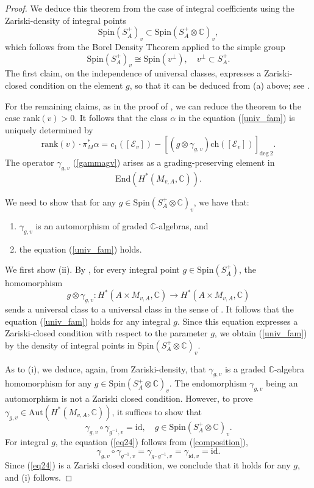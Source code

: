 \documentclass[11pt]{amsart}
\theoremstyle{plain}
\theoremstyle{definition}
\theoremstyle{remark}
\newcommand{\BC}{{\mathbb{C}}}
\newcommand{\CE}{{\mathcal E}}
\begin{document}
\begin{proof}
We deduce this theorem  from the case of integral coefficients using the Zariski-density of integral points
\[
\mathrm{Spin}(S_A^+)_v \subset \mathrm{Spin}(S_A^+ \otimes \BC)_v,
\]
which follows from the Borel Density Theorem \cite{Borel} applied to the simple group
\[
\mathrm{Spin}(S_A^+)_v \cong \mathrm{Spin}(v^\perp), \quad v^\perp \subset S_A^+.
\]
The first claim, on the independence of universal classes, expresses a Zariski-closed condition on the element $g$, so that  it can be deduced from (a) above; see \cite[Lemma 3.11]{Markman2}.

For the remaining claims, as in the proof of \cite[Corollary 8.4]{Markman3}, we can reduce the theorem to the case $\mathrm{rank}(v) >0$. It follows that  the class $\alpha$ in the equation (\ref{univ_fam}) is uniquely determined  by
\[
\mathrm{rank}(v) \cdot \pi_M^\ast \alpha = c_1([\CE_v])- \left[(g\otimes \gamma_{g,v}) \mathrm{ch}([\CE_v])\right]_{\mathrm{deg}~2}.
\]
The operator $\gamma_{g,v}$  (\ref{gammagv})  arises as a grading-preserving element in
 \[
\mathrm{End}(H^*(M_{v,A}, \BC)).
\]

We need to show that for any $g\in \mathrm{Spin}(S_A^+ \otimes \BC)_v$, we have that:
\begin{enumerate}
    \item[(i)] $\gamma_{g,v}$ is an automorphism of graded $\BC$-algebras, and
    \item[(ii)] the equation (\ref{univ_fam}) holds.
\end{enumerate}

We first show (ii). By \cite[Corollary 8.4]{Markman3},  for every integral point $g \in \mathrm{Spin}(S_A^+)$, the homomorphism 
\[
g\otimes \gamma_{g,v}: H^*(A \times M_{v,A}, \BC) \to H^*(A \times M_{v,A}, \BC)
\]
sends  a universal class to a universal class in the sense of \cite[Definition 3.4]{Markman3}.  It follows that the equation (\ref{univ_fam}) holds for any integral $g$. Since this equation expresses  a Zariski-closed condition with respect to the parameter $g$, we obtain (\ref{univ_fam}) by the density of integral points in $\mathrm{Spin}(S_A^+ \otimes \BC)_v$. 


As to (i),  we deduce, again, from  Zariski-density, that $\gamma_{g,v}$ is a graded $\BC$-algebra  homomorphism for any $g\in \mathrm{Spin}(S_A^+ \otimes \BC)_v$. The endomorphism $\gamma_{g,v}$ being an automorphism is not a Zariski closed condition. However, to prove $\gamma_{g,v} \in \mathrm{Aut}(H^*(M_{v,A},\BC))$, it suffices to show that 
\begin{equation}\label{eq24}
\gamma_{g,v} \circ \gamma_{g^{-1}, v} = \mathrm{id}, \quad g\in \mathrm{Spin}(S_A^+ \otimes \BC)_v.
\end{equation}
For integral $g$, the equation (\ref{eq24}) follows from (\ref{composition}),
\[
\gamma_{g,v} \circ \gamma_{g^{-1},v} = \gamma_{g\cdot g^{-1} , v} = \gamma_{\mathrm{id},v} = \mathrm{id}.
\]
Since (\ref{eq24}) is a Zariski closed condition, we conclude that it holds for any $g$, and (i) follows.
\end{proof}
\end{document}
